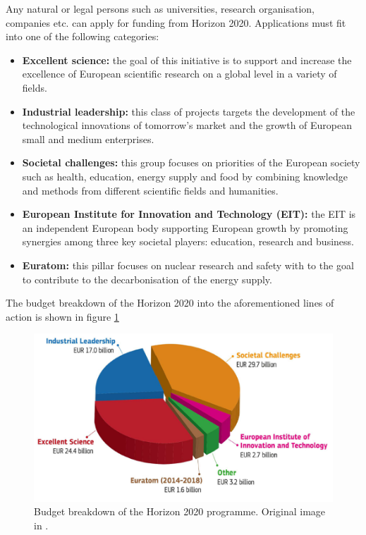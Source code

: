 
Any natural or legal persons such as universities, research organisation, companies etc. can apply for funding from Horizon 2020. Applications must fit into one of the following categories: 

\begin{itemize}
 \item \textbf{Excellent science:} the goal of this initiative is to support and increase the excellence of European scientific research on a global level in a variety of fields.
 \item \textbf{Industrial leadership:} this class of projects targets the development of the technological innovations of tomorrow's market and the growth of European small and medium enterprises.
 \item \textbf{Societal challenges:} this group focuses on priorities of the European society such as health, education, energy supply and food by combining knowledge and methods from different scientific fields and humanities.  
 \item \textbf{European Institute for Innovation and Technology (EIT):} the EIT is an independent European body supporting European growth by promoting synergies among three key societal players: education, research and business. 
 \item \textbf{Euratom:} this pillar focuses on nuclear research and safety with to the goal to contribute to the decarbonisation of the energy supply.
\end{itemize}

The budget breakdown of the Horizon 2020 into the aforementioned lines of action is shown in figure \ref{H2020_budget_breakdown}

\begin{figure}[!t] 
 \begin{center}
 \includegraphics[scale=0.3]{Images/H2020_budget_breakdown.png}
 \caption{Budget breakdown of the Horizon 2020 programme. Original image in \cite{OECD}.}
 \label{H2020_budget_breakdown}
 \end{center}
\end{figure}



